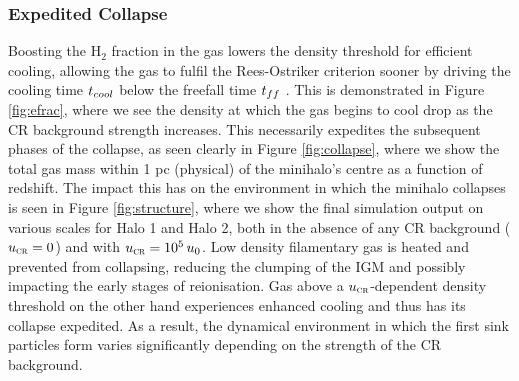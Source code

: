 \documentclass{thesis}
\newcommand{\htwo}{\ensuremath{\mathrm{H}_2}\xspace}
\newcommand{\ucr}{\ensuremath{{u}_{\textsc{cr}}}\xspace}
\begin{document}
\subsubsection{Expedited Collapse}
\label{sec:expedited_collapse}
Boosting the $\htwo$ fraction in the gas lowers the density threshold for efficient cooling, allowing the gas to fulfil the Rees-Ostriker criterion sooner by driving the cooling time $t_{\mathrm \small cool}$ below the freefall time $t_{\mathrm \small ff}$ \citep{ReesOstriker1977}.
This is demonstrated in Figure \ref{fig:efrac}, where we see the density at which the gas begins to cool drop as the CR background strength increases.  
This necessarily expedites the subsequent phases of the collapse, as seen clearly in Figure \ref{fig:collapse}, where we show the total gas mass within 1 pc (physical) of the minihalo's centre as a function of redshift.  
The impact this has on the environment in which the minihalo collapses is seen in Figure \ref{fig:structure}, where we show the final simulation output on various scales for Halo 1 and Halo 2, both in the absence of any CR background ($\ucr=0$) and with $\ucr=10^5\,u_0$. 
Low density filamentary gas is heated and prevented from collapsing, reducing the clumping of the IGM and possibly impacting the early stages of reionisation.
Gas above a $\ucr$-dependent density threshold on the other hand experiences enhanced cooling and thus has its collapse expedited.
As a result, the dynamical environment in which the first sink particles form varies significantly depending on the strength of the CR background.
\end{document}
